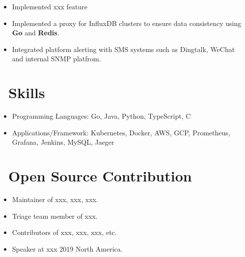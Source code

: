 \documentclass{resume}
\begin{document}
\begin{itemize}
  \item Implemented xxx feature
  \item Implemented a proxy for InfluxDB clusters to ensure data consistency using \textbf{Go} and \textbf{Redis}.
  \item Integrated platform alerting with SMS systems such as Dingtalk, WeChat and internal SNMP platfrom.
\end{itemize}

\section{\faCogs\ Skills}
\begin{itemize}[parsep=0.5ex]
  \item Programming Languages: Go, Java, Python, TypeScript, C
  \item Applications/Framework: Kubernetes, Docker, AWS, GCP, Prometheus, Grafana, Jenkins, MySQL, Jaeger
\end{itemize}

\section{\faInfo\ Open Source Contribution}
\begin{itemize}[parsep=0.5ex]
  \item Maintainer of xxx, xxx, xxx.
  \item Triage team member of xxx.
  \item Contributors of xxx, xxx, xxx, etc.
  \item Speaker at xxx 2019 North America.
\end{itemize}
\end{document}
